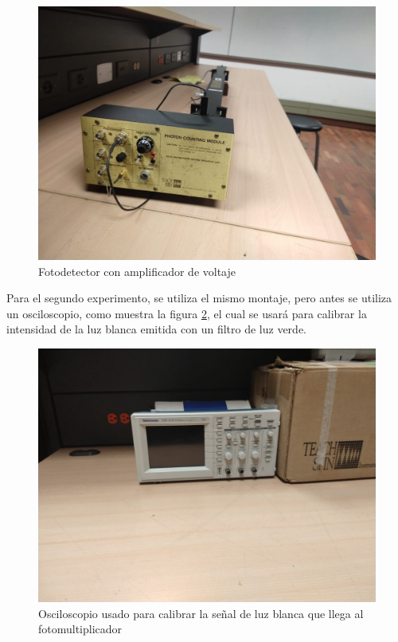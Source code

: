 \documentclass[%
 reprint,
 amsmath,amssymb,
 aps,
]{revtex4-1}
\begin{document}
\begin{figure}
    \centering
    \includegraphics[scale=0.1]{Double_Slit/Figuras/Foto_detector.jpg}
    \caption{Fotodetector con amplificador de voltaje}
    \label{fotodetector}
\end{figure}

Para el segundo experimento, se utiliza el mismo montaje, pero antes se utiliza un osciloscopio, como muestra la figura \ref{osciloscopio}, el cual se usará para calibrar la intensidad de la luz blanca emitida con un filtro de luz verde.

\begin{figure}
    \centering
    \includegraphics[scale=0.1]{Double_Slit/Figuras/Osciloscopio.jpg}
    \caption{Osciloscopio usado para calibrar la señal de luz blanca que llega al fotomultiplicador}
    \label{osciloscopio}
\end{figure}
\end{document}

